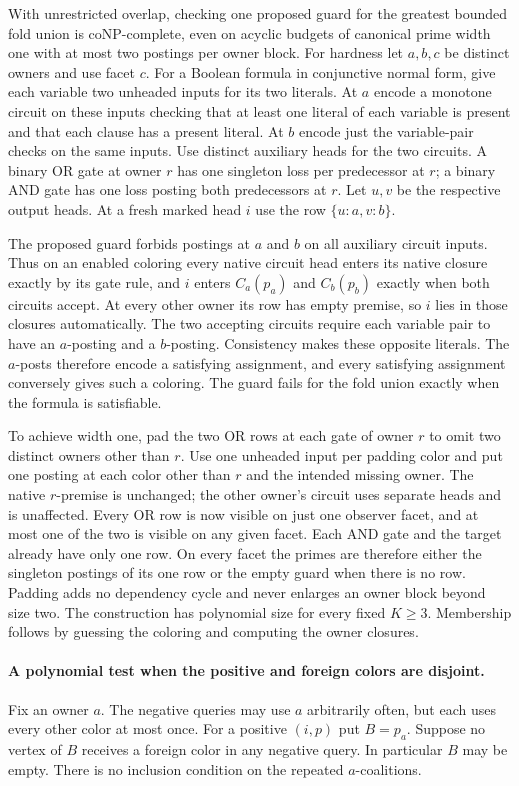 With unrestricted overlap, checking one proposed guard
for the greatest bounded fold union is coNP-complete,
even on acyclic budgets of canonical prime width one
with at most two postings per owner block.
For hardness let $a,b,c$ be distinct owners and use facet
$c$. For a Boolean formula in conjunctive normal form,
give each variable two unheaded inputs for its two
literals. At $a$ encode a monotone circuit on these
inputs checking that at least one literal of each
variable is present and that each clause has a present
literal. At $b$ encode just the variable-pair checks
on the same inputs. Use distinct auxiliary heads for
the two circuits. A binary OR gate at owner $r$ has one
singleton loss per predecessor at $r$; a binary AND
gate has one loss posting both predecessors at $r$.
Let $u,v$ be the respective output heads. At a fresh
marked head $i$ use the row $\{u:a,v:b\}$.

The proposed guard forbids postings at $a$ and $b$
on all auxiliary circuit inputs. Thus on an enabled
coloring every native circuit head enters its native
closure exactly by its gate rule, and $i$ enters
$C_a(p_a)$ and $C_b(p_b)$ exactly when both circuits
accept. At every other owner its row has empty premise,
so $i$ lies in those closures automatically. The
two accepting circuits require each variable pair to
have an $a$-posting and a $b$-posting. Consistency
makes these opposite literals. The $a$-posts therefore
encode a satisfying assignment, and every satisfying
assignment conversely gives such a coloring. The guard
fails for the fold union exactly when the formula is
satisfiable.

To achieve width one, pad the two OR rows at each
gate of owner $r$ to omit two distinct owners other
than $r$. Use one unheaded input per padding color
and put one posting at each color other than $r$ and
the intended missing owner. The native $r$-premise
is unchanged; the other owner's circuit uses separate
heads and is unaffected. Every OR row is now visible
on just one observer facet, and at most one of the
two is visible on any given facet. Each AND gate
and the target already have only one row. On every
facet the primes are therefore either the singleton
postings of its one row or the empty guard when
there is no row. Padding adds no dependency cycle
and never enlarges an owner block beyond size two.
The construction has polynomial size for every fixed
$K\ge3$. Membership follows by guessing the coloring
and computing the owner closures.

\paragraph{A polynomial test when the positive and foreign colors are disjoint.}
Fix an owner $a$. The negative queries may use $a$ arbitrarily often,
but each uses every other color at most once. For a positive $(i,p)$
put $B=p_a$. Suppose no vertex of $B$ receives a foreign color in
any negative query. In particular $B$ may be empty. There is no
inclusion condition on the repeated $a$-coalitions.

